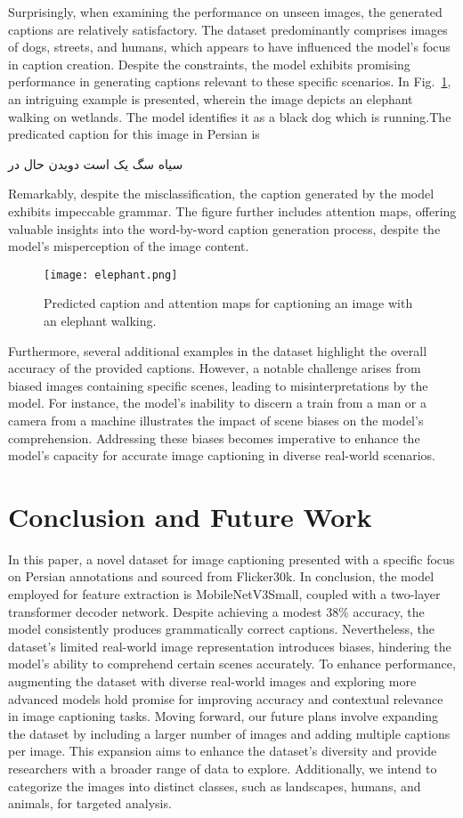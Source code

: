 \documentclass[runningheads]{llncs}
\begin{document}
Surprisingly, when examining the performance on unseen images, the generated captions are relatively satisfactory. The dataset predominantly comprises images of dogs, streets, and humans, which appears to have influenced the model's focus in caption creation. Despite the constraints, the model exhibits promising performance in generating captions relevant to these specific scenarios. In Fig.~\ref{fig5}, an intriguing example is presented, wherein the image depicts an elephant walking on wetlands. The model identifies it as a black dog which is running.The predicated caption for this image in Persian is \begin{farsi}
\arabicfont\small
 سیاه سگ یک است دویدن حال در
\end{farsi} Remarkably, despite the misclassification, the caption generated by the model exhibits impeccable grammar. The figure further includes attention maps, offering valuable insights into the word-by-word caption generation process, despite the model's misperception of the image content.

\begin{figure}
  \texttt{[image: elephant.png]}
  \caption{ Predicted caption and attention maps for captioning an image with an elephant walking.} \label{fig5}
\end{figure}

Furthermore, several additional examples in the dataset highlight the overall accuracy of the provided captions. However, a notable challenge arises from biased images containing specific scenes, leading to misinterpretations by the model. For instance, the model's inability to discern a train from a man or a camera from a machine illustrates the impact of scene biases on the model's comprehension. Addressing these biases becomes imperative to enhance the model's capacity for accurate image captioning in diverse real-world scenarios.

\section{Conclusion and Future Work}
In this paper, a novel dataset for image captioning presented with a specific focus on Persian annotations and sourced from Flicker30k.
In conclusion, the model employed for feature extraction is MobileNetV3Small, coupled with a two-layer transformer decoder network. Despite achieving a modest 38\% accuracy, the model consistently produces grammatically correct captions. Nevertheless, the dataset's limited real-world image representation introduces biases, hindering the model's ability to comprehend certain scenes accurately. To enhance performance, augmenting the dataset with diverse real-world images and exploring more advanced models hold promise for improving accuracy and contextual relevance in image captioning tasks.
Moving forward, our future plans involve expanding the dataset by including a larger number of images and adding multiple captions per image. This expansion aims to enhance the dataset's diversity and provide researchers with a broader range of data to explore. Additionally, we intend to categorize the images into distinct classes, such as landscapes, humans, and animals, for targeted analysis.
\end{document}
